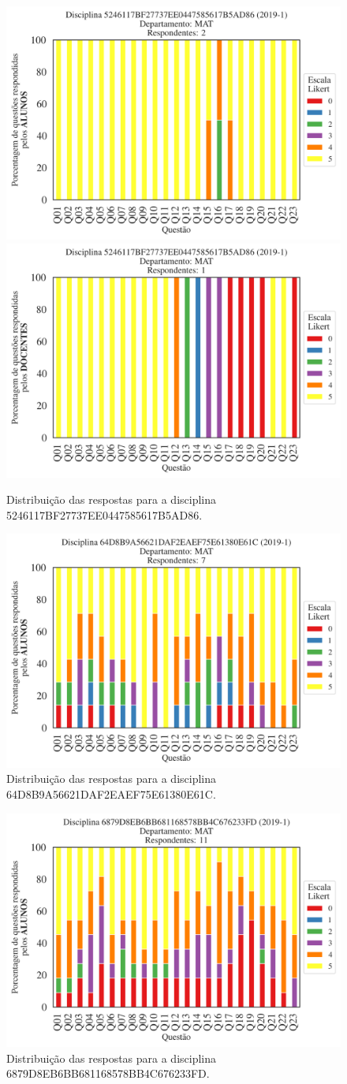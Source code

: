\documentclass[a4paper,10pt]{article}
\begin{document}
\begin{figure}[h]
\centering
\includegraphics[width=0.485\linewidth]{analise_disciplina_departamento_MAT_ALUNO_TURMA_5246117BF27737EE0447585617B5AD86.png}
\includegraphics[width=0.485\linewidth]{analise_disciplina_departamento_MAT_DOCENTE_TURMA_5246117BF27737EE0447585617B5AD86.png}
\caption{\label{fig:analise_geral_departamento}                Distribuição das respostas para a disciplina 5246117BF27737EE0447585617B5AD86.}
\end{figure}
\begin{figure}[h]
\centering
\includegraphics[width=0.485\linewidth]{analise_disciplina_departamento_MAT_ALUNO_TURMA_64D8B9A56621DAF2EAEF75E61380E61C.png}
\caption{\label{fig:analise_geral_departamento}                Distribuição das respostas para a disciplina 64D8B9A56621DAF2EAEF75E61380E61C.}
\end{figure}
\begin{figure}[h]
\centering
\includegraphics[width=0.485\linewidth]{analise_disciplina_departamento_MAT_ALUNO_TURMA_6879D8EB6BB681168578BB4C676233FD.png}
\caption{\label{fig:analise_geral_departamento}                Distribuição das respostas para a disciplina 6879D8EB6BB681168578BB4C676233FD.}
\end{figure}
\end{document}
